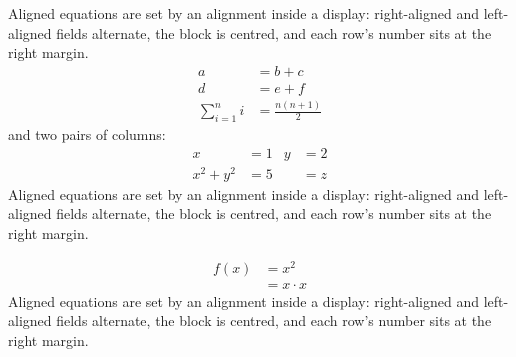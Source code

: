 \documentclass{article}
\begin{document}
Aligned equations are set by an alignment inside a display: right-aligned and left-aligned fields alternate, the block is centred, and each row's number sits at the right margin.
\begin{align}
a &= b + c \\
d &= e + f \nonumber \\
\sum_{i=1}^n i &= \frac{n(n+1)}{2}
\end{align}
and two pairs of columns:
\begin{align}
x &= 1 & y &= 2 \\
x^2 + y^2 &= 5 & & = z
\end{align}
Aligned equations are set by an alignment inside a display: right-aligned and left-aligned fields alternate, the block is centred, and each row's number sits at the right margin.

\begin{align*}
f(x) &= x^2 \\
&= x \cdot x
\end{align*}
Aligned equations are set by an alignment inside a display: right-aligned and left-aligned fields alternate, the block is centred, and each row's number sits at the right margin.
\end{document}

